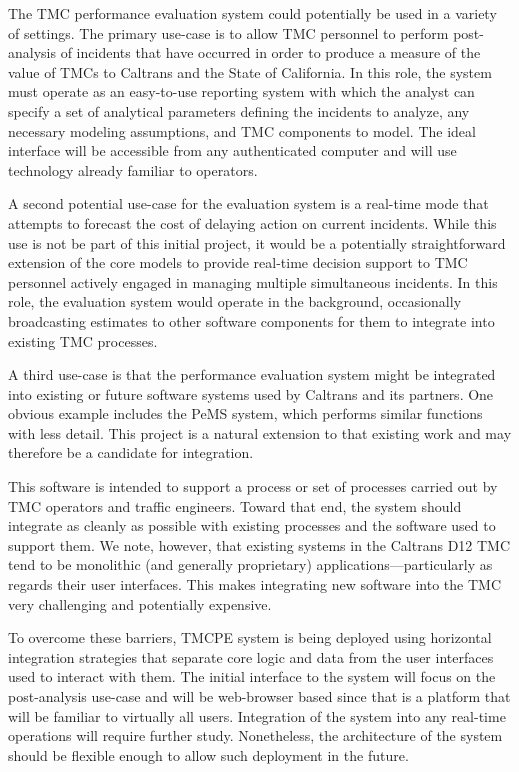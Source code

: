 \documentclass[12pt]{report}
\newcounter{time}
\begin{document}
The \ac{TMC} performance evaluation system could potentially be used in a
variety of settings. The primary use-case is to allow \ac{TMC} personnel to
perform post-analysis of incidents that have occurred in order to produce a
measure of the value of \acp{TMC} to Caltrans and the State of California. In
this role, the system must operate as an easy-to-use reporting system with which
the analyst can specify a set of analytical parameters defining the incidents to
analyze, any necessary modeling assumptions, and \ac{TMC} components to
model. The ideal interface will be accessible from any authenticated computer
and will use technology already familiar to operators.

A second potential use-case for the evaluation system is a real-time mode that
attempts to forecast the cost of delaying action on current incidents. While
this use is not be part of this initial project, it would be a potentially
straightforward extension of the core models to provide real-time decision
support to \ac{TMC} personnel actively engaged in managing multiple simultaneous
incidents. In this role, the evaluation system would operate in the background,
occasionally broadcasting estimates to other software components for them to
integrate into existing \ac{TMC} processes.

A third use-case is that the performance evaluation system might be integrated
into existing or future software systems used by Caltrans and its partners. One
obvious example includes the \ac{PeMS} system, which performs similar functions
with less detail. This project is a natural extension to that existing work and
may therefore be a candidate for integration.

This software is intended to support a process or set of processes carried out
by \ac{TMC} operators and traffic engineers.  Toward that end, the system should
integrate as cleanly as possible with existing processes and the software used
to support them.  We note, however, that existing systems in the Caltrans
\ac{D12} \ac{TMC} tend to be monolithic (and generally proprietary)
applications---particularly as regards their user interfaces.  This makes
integrating new software into the \ac{TMC} very challenging and potentially
expensive.

To overcome these barriers, \ac{TMCPE} system is being deployed using horizontal
integration strategies that separate core logic and data from the user
interfaces used to interact with them.  The initial interface to the system will
focus on the post-analysis use-case and will be web-browser based since that is
a platform that will be familiar to virtually all users.  Integration of the
system into any real-time operations will require further study.  Nonetheless,
the architecture of the system should be flexible enough to allow such
deployment in the future.
\end{document}
